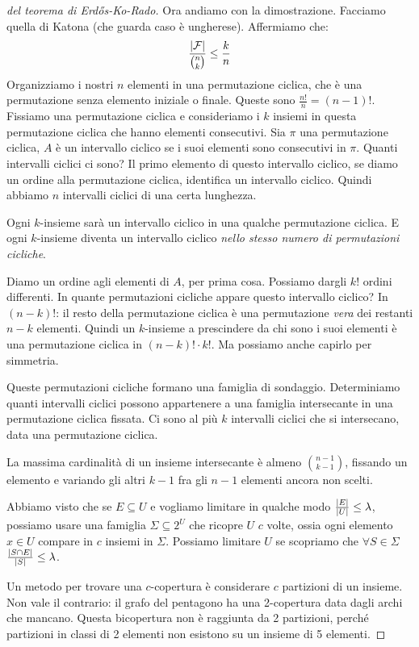 \begin{proof}[del teorema di Erd\H{o}s-Ko-Rado]
	Ora andiamo con la dimostrazione.
	Facciamo quella di Katona (che guarda caso \`e ungherese).
	Affermiamo che:
	\[
		\frac{\left\lvert{\mathcal{F}}\right\rvert}{\binom{n}{k}} \le \frac{k}{n}
	\]
	Organizziamo i nostri $n$ elementi in una permutazione ciclica, che \`e una permutazione senza elemento iniziale o finale.
	Queste sono $\frac{n!}{n} = (n-1)!$.
	Fissiamo una permutazione ciclica e consideriamo i $k$ insiemi in questa permutazione ciclica che hanno elementi consecutivi.
	Sia $\pi$ una permutazione ciclica, $A$ \`e un intervallo ciclico se i suoi elementi sono consecutivi in $\pi$.
	Quanti intervalli ciclici ci sono?
	Il primo elemento di questo intervallo ciclico, se diamo un ordine alla permutazione ciclica, identifica un intervallo ciclico.
	Quindi abbiamo $n$ intervalli ciclici di una certa lunghezza.

	Ogni $k$-insieme sar\`a un intervallo ciclico in una qualche permutazione ciclica.
	E ogni $k$-insieme diventa un intervallo ciclico \emph{nello stesso numero di permutazioni cicliche}.

	Diamo un ordine agli elementi di $A$, per prima cosa.
	Possiamo dargli $k!$ ordini differenti.
	In quante permutazioni cicliche appare questo intervallo ciclico?
	In $(n - k)!$: il resto della permutazione ciclica \`e una permutazione \emph{vera} dei restanti $n - k$ elementi.
	Quindi un $k$-insieme a prescindere da chi sono i suoi elementi \`e una permutazione ciclica in $(n-k)! \cdot k!$.
	Ma possiamo anche capirlo per simmetria.

	Queste permutazioni cicliche formano una famiglia di sondaggio.
	Determiniamo quanti intervalli ciclici possono appartenere a una famiglia intersecante in una permutazione ciclica fissata.
	Ci sono al pi\`u $k$ intervalli ciclici che si intersecano, data una permutazione ciclica.

	La massima cardinalit\`a di un insieme intersecante \`e almeno $\binom{n-1}{k-1}$, fissando un elemento e variando gli altri $k-1$ fra gli $n-1$ elementi ancora non scelti.

	Abbiamo visto che se $E \subseteq U$ e vogliamo limitare in qualche modo $\frac{\left\lvert{E}\right\rvert}{\left\lvert{U}\right\rvert} \le \lambda$, possiamo usare una famiglia $\Sigma \subseteq 2^{U}$ che ricopre $U$ $c$ volte, ossia ogni elemento $x \in U$ compare in $c$ insiemi in $\Sigma$.
	Possiamo limitare $U$ se scopriamo che $\forall S \in \Sigma$ $\frac{\left\lvert{S \cap E}\right\rvert}{\left\lvert{S}\right\rvert} \le \lambda$.

	Un metodo per trovare una $c$-copertura \`e considerare $c$ partizioni di un insieme.
	Non vale il contrario: il grafo del pentagono ha una 2-copertura data dagli archi che mancano.
	Questa bicopertura non \`e raggiunta da 2 partizioni, perch\'e partizioni in classi di 2 elementi non esistono su un insieme di 5 elementi.


\end{proof}
